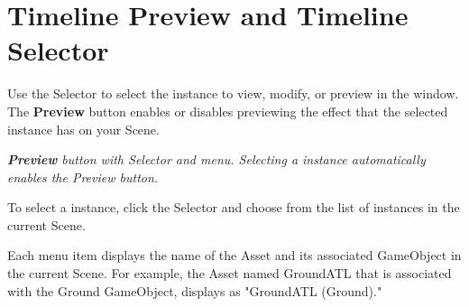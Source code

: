 \chapter{Timeline Preview and Timeline Selector}
\hypertarget{md__hey_tea_9_2_library_2_package_cache_2com_8unity_8timeline_0d1_87_85_2_documentation_0i_2tl__selector}{}\label{md__hey_tea_9_2_library_2_package_cache_2com_8unity_8timeline_0d1_87_85_2_documentation_0i_2tl__selector}
\label{md__hey_tea_9_2_library_2_package_cache_2com_8unity_8timeline_0d1_87_85_2_documentation_0i_2tl__selector_autotoc_md4746}%
%
 Use the  Selector to select the  instance to view, modify, or preview in the  window. The  {\bfseries{Preview}} button enables or disables previewing the effect that the selected  instance has on your Scene.



{\itshape {} {\bfseries{Preview}} button with  Selector and menu. Selecting a  instance automatically enables the  Preview button.}

To select a  instance, click the  Selector and choose from the list of  instances in the current Scene.

Each menu item displays the name of the  Asset and its associated Game\+Object in the current Scene. For example, the  Asset named Ground\+ATL that is associated with the Ground Game\+Object, displays as "{}\+Ground\+ATL (\+Ground)."{} 